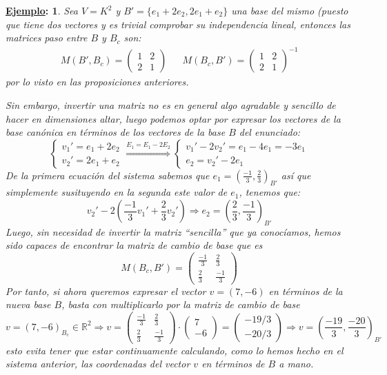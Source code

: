 \documentclass[10pt,a4paper,openright]{book}
\theoremstyle{break}
\newtheorem*{ej}{\underline{Ejemplo}:}
\begin{document}
\begin{ej}
Sea $V=K^2$ y $B'=\{e_1+2e_2, 2e_1+e_2\}$ una base del mismo (puesto que tiene dos vectores y es trivial comprobar su independencia lineal, entonces las matrices paso entre $B$ y $B_c$ son:
\begin{align*}
M(B',B_c)=\left(\begin{array}{cc}1&2\\2&1\end{array}\right) & & M(B_c,B')=\left(\begin{array}{cc}1&2\\2&1\end{array}\right)^{-1}
\end{align*}
por lo visto en las proposiciones anteriores.

Sin embargo, invertir una matriz no es en general algo agradable y sencillo de hacer en dimensiones altar, luego podemos optar por expresar los vectores de la base canónica en términos de los vectores de la base $B$ del enunciado:
$$
\begin{cases}
v_1'=e_1+2e_2 \\
v_2'=2e_1+e_2
\end{cases}\stackrel{E_1 = E_1 - 2E_2}{\Rightarrow}
\begin{cases}
v_1'-2v_2'=e_1-4e_1=-3e_1 \\
e_2 = v_2'-2e_1
\end{cases} 
$$
De la primera ecuación del sistema sabemos que $e_1=(\frac{-1}{3}, \frac{2}{3})_{B'}$ así que simplemente susituyendo en la segunda este valor de $e_1$, tenemos que:
$$
v_2'-2\left(\frac{-1}{3}v_1'+\frac{2}{3}v_2'\right)\Rightarrow e_2 = \left(\frac{2}{3},\frac{-1}{3}\right)_{B'}
$$
Luego, sin necesidad de invertir la matriz ``sencilla'' que ya conocíamos, hemos sido capaces de encontrar la matriz de cambio de base que es
$$
M(B_c,B')=\left(\begin{array}{cc}
\frac{-1}{3} & \frac{2}{3}\\
\frac{2}{3} & \frac{-1}{3}
\end{array}\right)
$$
Por tanto, si ahora queremos expresar el vector $v=(7,-6)$ en términos de la nueva base $B$, basta con multiplicarlo por la matriz de cambio de base
$$
v=(7,-6)_{B_c}\in \mathbb R^2\Rightarrow v=\left(\begin{array}{cc}
\frac{-1}{3} & \frac{2}{3}\\
\frac{2}{3} & \frac{-1}{3}
\end{array}\right)\cdot \left(\begin{array}{c}
7\\
-6
\end{array}\right)=\left(\begin{array}{c}
-19/3 \\
-20/3
\end{array}\right)\Rightarrow v = \left(\frac{-19}{3}, \frac{-20}{3}\right)_{B'}
$$
esto evita tener que estar continuamente calculando, como lo hemos hecho en el sistema anterior, las coordenadas del vector $v$ en términos de $B$ a mano.
\end{ej}
\end{document}
